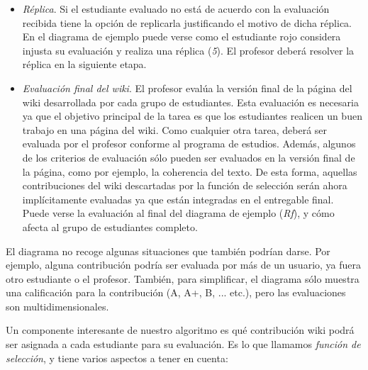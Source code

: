 \begin{itemize}
\item \emph{Réplica}. Si el estudiante evaluado no está de acuerdo con la evaluación recibida tiene la opción de replicarla justificando el motivo de dicha réplica. En el diagrama de ejemplo puede verse como el estudiante rojo considera injusta su evaluación y realiza una réplica (\emph{5}). El profesor deberá resolver la réplica en la siguiente etapa.
\item \emph{Evaluación final del wiki}. El profesor evalúa la versión final de la página del wiki desarrollada por cada grupo de estudiantes. Esta evaluación es necesaria ya que el objetivo principal de la tarea es que los estudiantes realicen un buen trabajo en una página del wiki. Como cualquier otra tarea, deberá ser evaluada por el profesor conforme al programa de estudios. Además, algunos de los criterios de evaluación sólo pueden ser evaluados en la versión final de la página, como por ejemplo, la coherencia del texto. De esta forma, aquellas contribuciones del wiki descartadas por la función de selección serán ahora implícitamente evaluadas ya que están integradas en el entregable final. Puede verse la evaluación al final del diagrama de ejemplo (\emph{Rf}), y cómo afecta al grupo de estudiantes completo.
\end{itemize}

El diagrama no recoge algunas situaciones que también podrían darse. Por ejemplo, alguna contribución podría ser evaluada por más de un usuario, ya fuera otro estudiante o el profesor. También, para simplificar, el diagrama sólo muestra una calificación para la contribución (A, A+, B, ... etc.), pero las evaluaciones son multidimensionales.

Un componente interesante de nuestro algoritmo es qué contribución wiki podrá ser asignada a cada estudiante para su evaluación. Es lo que llamamos \emph{función de selección}, y tiene varios aspectos a tener en cuenta:

